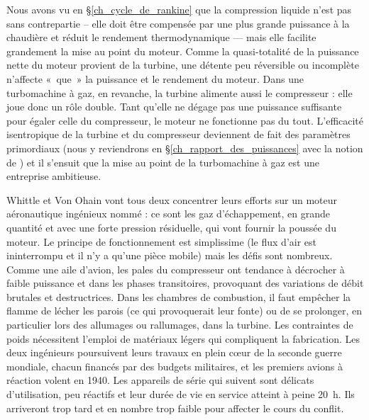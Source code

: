 Nous avons vu en \S\ref{ch_cycle_de_rankine} que la compression liquide n’est pas sans contrepartie – elle doit être compensée par une plus grande puissance à la chaudière et réduit le rendement thermodynamique — mais elle facilite grandement la mise au point du moteur. Comme la quasi-totalité de la puissance nette du moteur provient de la turbine, une détente peu réversible ou incomplète n’affecte «~que~» la puissance et le rendement du moteur. Dans une turbomachine à gaz, en revanche, la turbine alimente aussi le compresseur : elle joue donc un rôle double. Tant qu’elle ne dégage pas une puissance suffisante pour égaler celle du compresseur, le moteur ne fonctionne pas du tout. L’efficacité isentropique de la turbine et du compresseur deviennent de fait des paramètres primordiaux (nous y reviendrons en \S\ref{ch_rapport_des_puissances} avec la notion de ) et il s’ensuit que la mise au point de la turbomachine à gaz est une entreprise ambitieuse.


Whittle et Von Ohain vont tous deux concentrer leurs efforts sur un moteur aéronautique ingénieux nommé  : ce sont les gaz d’échappement, en grande quantité et avec une forte pression résiduelle, qui vont fournir la poussée du moteur. Le principe de fonctionnement est simplissime (le flux d’air est ininterrompu et il n’y a qu’une pièce mobile) mais les défis sont nombreux. Comme une aile d’avion, les pales du compresseur ont tendance à décrocher à faible puissance et dans les phases transitoires, provoquant des variations de débit brutales et destructrices. Dans les chambres de combustion, il faut empêcher la flamme de lécher les parois (ce qui provoquerait leur fonte) ou de se prolonger, en particulier lors des allumages ou rallumages, dans la turbine. Les contraintes de poids nécessitent l’emploi de matériaux légers qui compliquent la fabrication. Les deux ingénieurs poursuivent leurs travaux en plein cœur de la seconde guerre mondiale, chacun financés par des budgets militaires, et les premiers avions à réaction volent en 1940. Les appareils de série qui suivent sont délicats d’utilisation, peu réactifs et leur durée de vie en service atteint à peine \SI{20}{\hour}. Ils arriveront trop tard et en nombre trop faible pour affecter le cours du conflit.

